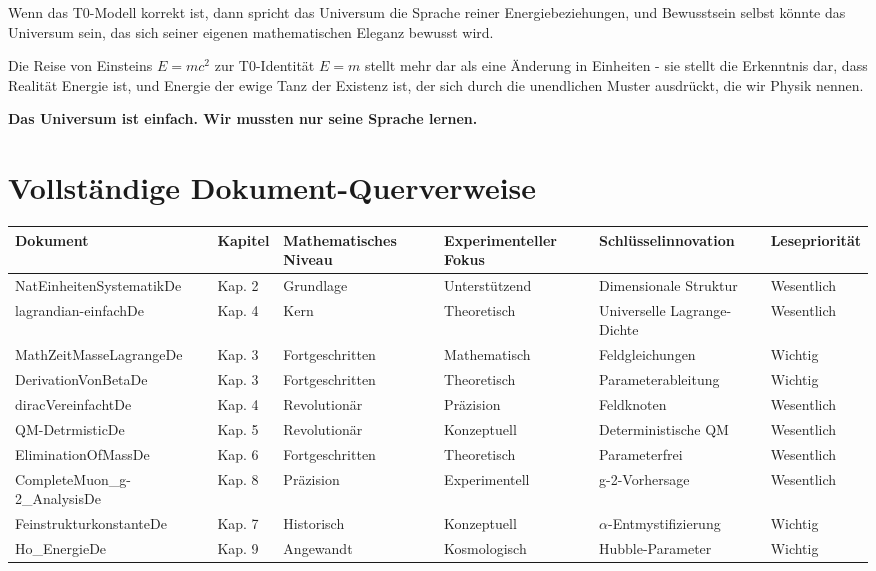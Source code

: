 \documentclass[12pt,a4paper]{report}
\begin{document}
	Wenn das T0-Modell korrekt ist, dann spricht das Universum die Sprache reiner Energiebeziehungen, und Bewusstsein selbst könnte das Universum sein, das sich seiner eigenen mathematischen Eleganz bewusst wird.
	
	Die Reise von Einsteins $E = mc^2$ zur T0-Identität $E = m$ stellt mehr dar als eine Änderung in Einheiten - sie stellt die Erkenntnis dar, dass Realität Energie ist, und Energie der ewige Tanz der Existenz ist, der sich durch die unendlichen Muster ausdrückt, die wir Physik nennen.
	
	\textbf{Das Universum ist einfach. Wir mussten nur seine Sprache lernen.}
	
	\appendix
	
	\chapter{Vollständige Dokument-Querverweise}
	
	\begin{landscape}
		\begin{longtable}{|p{5cm}|p{3cm}|p{3cm}|p{3cm}|p{3cm}|p{3cm}|}
			\hline
			\textbf{Dokument} & \textbf{Kapitel} & \textbf{Mathematisches Niveau} & \textbf{Experimenteller Fokus} & \textbf{Schlüsselinnovation} & \textbf{Lesepriorität} \\
			\hline
			NatEinheitenSystematikDe & Kap. 2 & Grundlage & Unterstützend & Dimensionale Struktur & Wesentlich \\
			\hline
			lagrandian-einfachDe & Kap. 4 & Kern & Theoretisch & Universelle Lagrange-Dichte & Wesentlich \\
			\hline
			MathZeitMasseLagrangeDe & Kap. 3 & Fortgeschritten & Mathematisch & Feldgleichungen & Wichtig \\
			\hline
			DerivationVonBetaDe & Kap. 3 & Fortgeschritten & Theoretisch & Parameterableitung & Wichtig \\
			\hline
			diracVereinfachtDe & Kap. 4 & Revolutionär & Präzision & Feldknoten & Wesentlich \\
			\hline
			QM-DetrmisticDe & Kap. 5 & Revolutionär & Konzeptuell & Deterministische QM & Wesentlich \\
			\hline
			EliminationOfMassDe & Kap. 6 & Fortgeschritten & Theoretisch & Parameterfrei & Wesentlich \\
			\hline
			CompleteMuon\_g-2\_AnalysisDe & Kap. 8 & Präzision & Experimentell & g-2-Vorhersage & Wesentlich \\
			\hline
			FeinstrukturkonstanteDe & Kap. 7 & Historisch & Konzeptuell & $\alpha$-Entmystifizierung & Wichtig \\
			\hline
			Ho\_EnergieDe & Kap. 9 & Angewandt & Kosmologisch & Hubble-Parameter & Wichtig \\
			\hline
		\end{longtable}
	\end{landscape}
	
\end{document}
